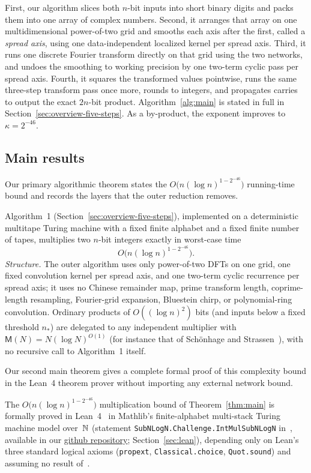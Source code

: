 First, our algorithm slices both $n$-bit inputs into short binary digits and packs them into one array of complex numbers. Second, it arranges that array on one multidimensional power-of-two grid and smooths each axis after the first, called a \emph{spread axis}, using one data-independent localized kernel per spread axis. Third, it runs one discrete Fourier transform directly on that grid using the two networks, and undoes the smoothing to working precision by one two-term cyclic pass per spread axis. Fourth, it squares the transformed values pointwise, runs the same three-step transform pass once more, rounds to integers, and propagates carries to output the exact $2n$-bit product. Algorithm~\ref{alg:main} is stated in full in Section~\ref{sec:overview-five-steps}. As a by-product, the exponent improves to $\kappa=2^{-46}$.

\subsection{Main results}\label{sec:intro-results}

Our primary algorithmic theorem states the $O\bigl(n(\log n)^{1-2^{-46}}\bigr)$ running-time bound and records the layers that the outer reduction removes.

\begin{maintheorem}\label{thm:main}
Algorithm~1 (Section~\ref{sec:overview-five-steps}), implemented on a deterministic multitape Turing machine with a fixed finite alphabet and a fixed finite number of tapes, multiplies two $n$-bit integers exactly in worst-case time
\[
  O\bigl(n(\log n)^{1-2^{-46}}\bigr).
\]
\emph{Structure.} The outer algorithm uses only power-of-two DFTs on one grid, one fixed convolution kernel per spread axis, and one two-term cyclic recurrence per spread axis; it uses no Chinese remainder map, prime transform length, coprime-length resampling, Fourier-grid expansion, Bluestein chirp, or polynomial-ring convolution. Ordinary products of $O((\log n)^2)$ bits (and inputs below a fixed threshold $n_*$) are delegated to any independent multiplier with $\mathsf M(N)=N(\log N)^{O(1)}$ (for instance that of Sch\"onhage and Strassen~\cite{SS71}), with no recursive call to Algorithm~1 itself.
\end{maintheorem}

Our second main theorem gives a complete formal proof of this complexity bound in the Lean~4 theorem prover without importing any external network bound.

\begin{maintheorem}\label{thm:lean}
The $O\bigl(n(\log n)^{1-2^{-46}}\bigr)$ multiplication bound of Theorem~\ref{thm:main} is formally proved in Lean~4~\cite{dMU21,Mathlib20} in Mathlib's finite-alphabet multi-stack Turing machine model over~$\mathbb{N}$ (statement \texttt{SubNLogN.Challenge.IntMulSubNLogN} in~\cite{Lean26}, available in our \href{https://github.com/lockqueue/intmul}{github repository}; Section~\ref{sec:lean}), depending only on Lean's three standard logical axioms (\texttt{propext}, \texttt{Classical.choice}, \texttt{Quot.sound}) and assuming no result of~\cite{OAI26}.
\end{maintheorem}

